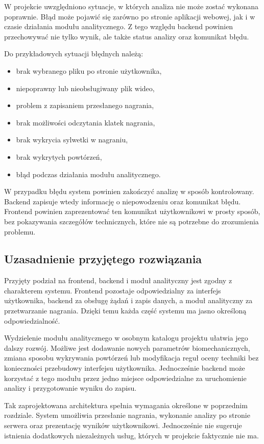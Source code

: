 W projekcie uwzględniono sytuacje, w których analiza nie może zostać wykonana poprawnie. Błąd może pojawić się zarówno po stronie aplikacji webowej, jak i w czasie działania modułu analitycznego. Z tego względu backend powinien przechowywać nie tylko wynik, ale także status analizy oraz komunikat błędu.

Do przykładowych sytuacji błędnych należą:

\begin{itemize}
\item brak wybranego pliku po stronie użytkownika,
\item niepoprawny lub nieobsługiwany plik wideo,
\item problem z zapisaniem przesłanego nagrania,
\item brak możliwości odczytania klatek nagrania,
\item brak wykrycia sylwetki w nagraniu,
\item brak wykrytych powtórzeń,
\item błąd podczas działania modułu analitycznego.
\end{itemize}

W przypadku błędu system powinien zakończyć analizę w sposób kontrolowany. Backend zapisuje wtedy informację o niepowodzeniu oraz komunikat błędu. Frontend powinien zaprezentować ten komunikat użytkownikowi w prosty sposób, bez pokazywania szczegółów technicznych, które nie są potrzebne do zrozumienia problemu.

\subsection{Uzasadnienie przyjętego rozwiązania}

Przyjęty podział na frontend, backend i moduł analityczny jest zgodny z charakterem systemu. Frontend pozostaje odpowiedzialny za interfejs użytkownika, backend za obsługę żądań i zapis danych, a moduł analityczny za przetwarzanie nagrania. Dzięki temu każda część systemu ma jasno określoną odpowiedzialność.

Wydzielenie modułu analitycznego w osobnym katalogu projektu ułatwia jego dalszy rozwój. Możliwe jest dodawanie nowych parametrów biomechanicznych, zmiana sposobu wykrywania powtórzeń lub modyfikacja reguł oceny techniki bez konieczności przebudowy interfejsu użytkownika. Jednocześnie backend może korzystać z tego modułu przez jedno miejsce odpowiedzialne za uruchomienie analizy i przygotowanie wyniku do zapisu.

Tak zaprojektowana architektura spełnia wymagania określone w poprzednim rozdziale. System umożliwia przesłanie nagrania, wykonanie analizy po stronie serwera oraz prezentację wyników użytkownikowi. Jednocześnie nie sugeruje istnienia dodatkowych niezależnych usług, których w projekcie faktycznie nie ma.

